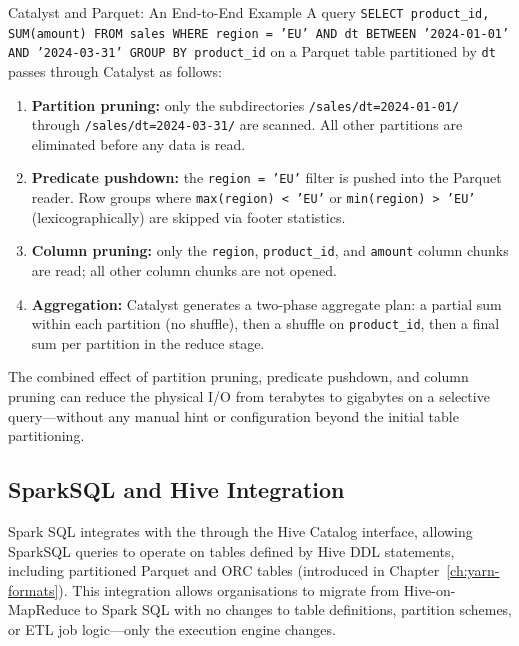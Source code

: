 \begin{systemdesign}{Catalyst and Parquet: An End-to-End Example}
A query \texttt{SELECT product\_id, SUM(amount) FROM sales WHERE region
= 'EU' AND dt BETWEEN '2024-01-01' AND '2024-03-31' GROUP BY
product\_id} on a Parquet table partitioned by \texttt{dt} passes
through Catalyst as follows:
\begin{enumerate}
  \item \textbf{Partition pruning:} only the subdirectories
        \texttt{/sales/dt=2024-01-01/} through
        \texttt{/sales/dt=2024-03-31/} are scanned. All other partitions
        are eliminated before any data is read.
  \item \textbf{Predicate pushdown:} the \texttt{region = 'EU'} filter
        is pushed into the Parquet reader. Row groups where
        \texttt{max(region) < 'EU'} or \texttt{min(region) > 'EU'}
        (lexicographically) are skipped via footer statistics.
  \item \textbf{Column pruning:} only the \texttt{region},
        \texttt{product\_id}, and \texttt{amount} column chunks are read;
        all other column chunks are not opened.
  \item \textbf{Aggregation:} Catalyst generates a two-phase aggregate
        plan: a partial sum within each partition (no shuffle), then a
        shuffle on \texttt{product\_id}, then a final sum per partition
        in the reduce stage.
\end{enumerate}
The combined effect of partition pruning, predicate pushdown, and column
pruning can reduce the physical I/O from terabytes to gigabytes on a
selective query---without any manual hint or configuration beyond
the initial table partitioning.
\end{systemdesign}

\subsection{SparkSQL and Hive Integration}
\label{subsec:spark-hive}

Spark SQL integrates with the  through the Hive
Catalog interface, allowing SparkSQL queries to operate on tables defined
by Hive DDL statements, including partitioned Parquet and ORC tables
(introduced in Chapter~\ref{ch:yarn-formats}). This integration allows
organisations to migrate from Hive-on-MapReduce to Spark SQL with no
changes to table definitions, partition schemes, or ETL job logic---only
the execution engine changes.

